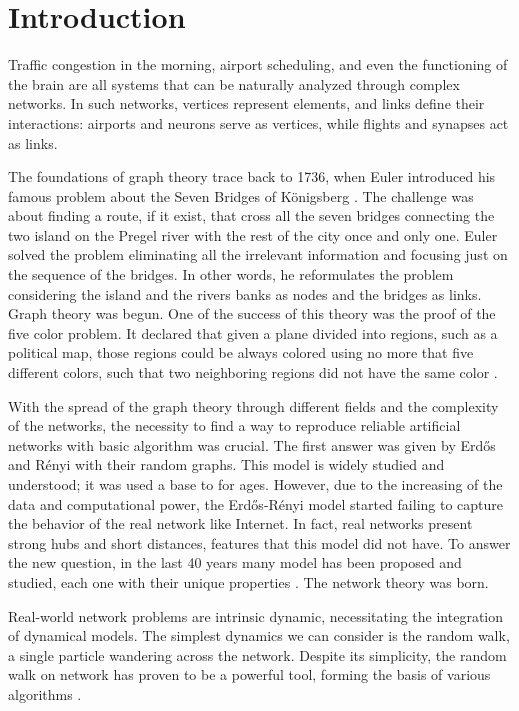 \chapter*{Introduction}

Traffic congestion in the morning, airport scheduling, and even the functioning of the brain are all systems that can be naturally analyzed through complex networks. In such networks, vertices represent elements, and links define their interactions: airports and neurons serve as vertices, while flights and synapses act as links.

The foundations of graph theory trace back to 1736, when Euler introduced his famous problem about the Seven Bridges of Königsberg \cite{Euler}. The challenge was about finding a route, if it exist, that cross all the seven bridges connecting the two island on the Pregel river with the rest of the city once and only one. Euler solved the problem eliminating all the irrelevant information and focusing just on the sequence of the bridges. In other words, he reformulates the problem considering the island and the rivers banks as nodes and the bridges as links.
Graph theory was begun. One of the success of this theory was the proof of the five color problem. It declared that given a plane divided into regions, such as a political map, those regions could be always colored using no more that five different colors, such that two neighboring regions did not have the same color \cite{Heawood_color_theorem,Ringel_Color_Theorem}.

With the spread of the graph theory through different fields and the complexity of the networks, the necessity to find a way to reproduce reliable  artificial networks with basic algorithm was crucial. The first answer was given by Erd\H{o}s and Rényi \cite{erdos-renyi1960,Erdos-renyi1959} with their random graphs. This model is widely studied and understood; it was used a base to for ages. 
However, due to the increasing of the data and computational power, the Erd\H{o}s-Rényi model started failing to capture the behavior of the real network like Internet. In fact, real networks present strong hubs and short distances, features that this model did not have. 
To answer the new question, in the last 40 years many model has been proposed and studied, each one with their unique properties \cite{Barabasi_Albert_1999,Watts-Strogatz_1998}. The network theory was born. 

Real-world network problems are intrinsic dynamic, necessitating the integration of dynamical models. The simplest dynamics we can consider is the random walk, a single particle wandering across the network. 
Despite its simplicity, the random walk on network has proven to be a powerful tool, forming the basis of various algorithms \cite{Classic_random_walk,Pagerank_2015,Pagerank_1998}.


